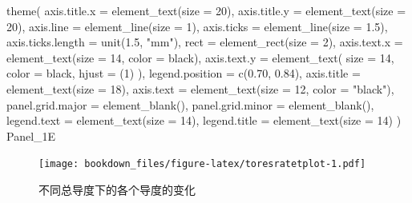 \documentclass[
]{krantz}
\makeatletter
\newenvironment{Shaded}{\begin{snugshade}}{\end{snugshade}}
\newcommand{\AttributeTok}[1]{\textcolor[rgb]{0.77,0.63,0.00}{#1}}
\newcommand{\DecValTok}[1]{\textcolor[rgb]{0.00,0.00,0.81}{#1}}
\newcommand{\FloatTok}[1]{\textcolor[rgb]{0.00,0.00,0.81}{#1}}
\newcommand{\FunctionTok}[1]{\textcolor[rgb]{0.00,0.00,0.00}{#1}}
\newcommand{\NormalTok}[1]{#1}
\newcommand{\StringTok}[1]{\textcolor[rgb]{0.31,0.60,0.02}{#1}}
\newenvironment{kframe}{%
\medskip{}
\setlength{\fboxsep}{.8em}
 \def\at@end@of@kframe{}%
 \ifinner\ifhmode%
  \def\at@end@of@kframe{\end{minipage}}%
  \begin{minipage}{\columnwidth}%
 \fi\fi%
 \def\FrameCommand##1{\hskip\@totalleftmargin \hskip-\fboxsep
 \colorbox{shadecolor}{##1}\hskip-\fboxsep
     \hskip-\linewidth \hskip-\@totalleftmargin \hskip\columnwidth}%
 \MakeFramed {\advance\hsize-\width
   \@totalleftmargin\z@ \linewidth\hsize
   \@setminipage}}%
 {\par\unskip\endMakeFramed%
 \at@end@of@kframe}
\renewenvironment{Shaded}{\begin{kframe}}{\end{kframe}}
\makeatother
\begin{document}
\begin{Shaded}
\begin{Highlighting}[]
  \FunctionTok{theme}\NormalTok{(}
    \AttributeTok{axis.title.x =} \FunctionTok{element\_text}\NormalTok{(}\AttributeTok{size =} \DecValTok{20}\NormalTok{),}
    \AttributeTok{axis.title.y =} \FunctionTok{element\_text}\NormalTok{(}\AttributeTok{size =} \DecValTok{20}\NormalTok{),}
    \AttributeTok{axis.line =} \FunctionTok{element\_line}\NormalTok{(}\AttributeTok{size =} \DecValTok{1}\NormalTok{),}
    \AttributeTok{axis.ticks =} \FunctionTok{element\_line}\NormalTok{(}\AttributeTok{size =} \FloatTok{1.5}\NormalTok{),}
    \AttributeTok{axis.ticks.length =} \FunctionTok{unit}\NormalTok{(}\FloatTok{1.5}\NormalTok{, }\StringTok{"mm"}\NormalTok{),}
    \AttributeTok{rect =} \FunctionTok{element\_rect}\NormalTok{(}\AttributeTok{size =} \DecValTok{2}\NormalTok{),}
    \AttributeTok{axis.text.x =} \FunctionTok{element\_text}\NormalTok{(}\AttributeTok{size =} \DecValTok{14}\NormalTok{, }\AttributeTok{color =} \StringTok{\textquotesingle{}black\textquotesingle{}}\NormalTok{),}
    \AttributeTok{axis.text.y =}
      \FunctionTok{element\_text}\NormalTok{(}
        \AttributeTok{size =} \DecValTok{14}\NormalTok{,}
        \AttributeTok{color =} \StringTok{\textquotesingle{}black\textquotesingle{}}\NormalTok{,}
        \AttributeTok{hjust =}\NormalTok{ (}\DecValTok{1}\NormalTok{)}
\NormalTok{      ),}
    \AttributeTok{legend.position =} \FunctionTok{c}\NormalTok{(}\FloatTok{0.70}\NormalTok{, }\FloatTok{0.84}\NormalTok{),}
    \AttributeTok{axis.title =} \FunctionTok{element\_text}\NormalTok{(}\AttributeTok{size =} \DecValTok{18}\NormalTok{),}
    \AttributeTok{axis.text =} \FunctionTok{element\_text}\NormalTok{(}\AttributeTok{size =} \DecValTok{12}\NormalTok{, }\AttributeTok{color =} \StringTok{"black"}\NormalTok{),}
    \AttributeTok{panel.grid.major =} \FunctionTok{element\_blank}\NormalTok{(),}
    \AttributeTok{panel.grid.minor =} \FunctionTok{element\_blank}\NormalTok{(),}
    \AttributeTok{legend.text =} \FunctionTok{element\_text}\NormalTok{(}\AttributeTok{size =} \DecValTok{14}\NormalTok{),}
    \AttributeTok{legend.title =} \FunctionTok{element\_text}\NormalTok{(}\AttributeTok{size =} \DecValTok{14}\NormalTok{)}
\NormalTok{  )}
\NormalTok{Panel\_1E}
\end{Highlighting}
\end{Shaded}

\begin{figure}
\centering
\texttt{[image: bookdown\_files/figure-latex/toresratetplot-1.pdf]}
\caption{\label{fig:toresratetplot}不同总导度下的各个导度的变化}
\end{figure}
\end{document}
